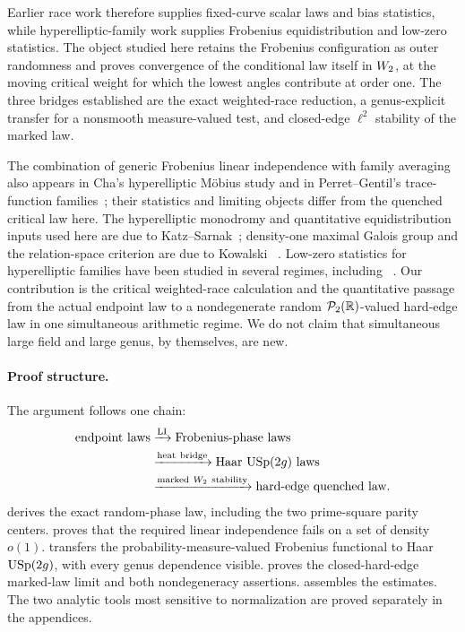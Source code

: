 Earlier race work therefore supplies fixed-curve scalar laws and bias
statistics, while hyperelliptic-family work supplies Frobenius
equidistribution and low-zero statistics.  The object studied here retains the
Frobenius configuration as outer randomness and proves convergence of the
conditional law itself in \(W_2\), at the moving critical weight for which
the lowest angles contribute at order one.  The three bridges established are the
exact weighted-race reduction, a genus-explicit transfer for a nonsmooth
measure-valued test, and closed-edge \(\ell^2\) stability of the marked law.

The
combination of generic Frobenius linear independence with family averaging
also appears in Cha's hyperelliptic M\"obius study and in Perret--Gentil's
trace-function families~\cite{ChaMobius2010,PerretGentil2019}; their
statistics and limiting objects differ from the quenched critical law here.
The
hyperelliptic monodromy and quantitative equidistribution inputs used here are
due to Katz--Sarnak~\cite{KatzSarnak1999}; density-one maximal Galois group and
the relation-space criterion are due to Kowalski
~\cite{Kowalski2006,KowalskiErratum,Kowalski2008}.  Low-zero statistics for
hyperelliptic families have been studied in several regimes, including
~\cite{EntinRodittyGershonRudnick2013,EntinPirani2024}.  Our contribution is
the critical weighted-race calculation and the quantitative passage from the
actual endpoint law to a nondegenerate random \(\mathcal P_2(\mathbb R)\)-valued hard-edge law
in one simultaneous arithmetic regime.  We do not claim that simultaneous
large field and large genus, by themselves, are new.

\paragraph{Proof structure.}
The argument follows one chain:
\[
 \begin{aligned}
 \text{endpoint laws}
   &\xrightarrow{\mathrm{LI}}\text{Frobenius-phase laws}\\
   &\xrightarrow{\mathrm{heat\ bridge}}\text{Haar }\mathrm{USp}(2g)\text{ laws}\\
   &\xrightarrow{\mathrm{marked}\ W_2\ \mathrm{stability}}
     \text{hard-edge quenched law}.
 \end{aligned}
\]
 derives the exact random-phase law, including the two
prime-square parity centers.   proves that the
required linear independence fails on a set of density \(o(1)\).
 transfers the probability-measure-valued Frobenius
functional to Haar \(\mathrm{USp}(2g)\), with every genus dependence visible.
 proves the closed-hard-edge marked-law limit and both
nondegeneracy assertions.   assembles the estimates.  The
two analytic tools most sensitive to normalization are proved separately in
the appendices.
